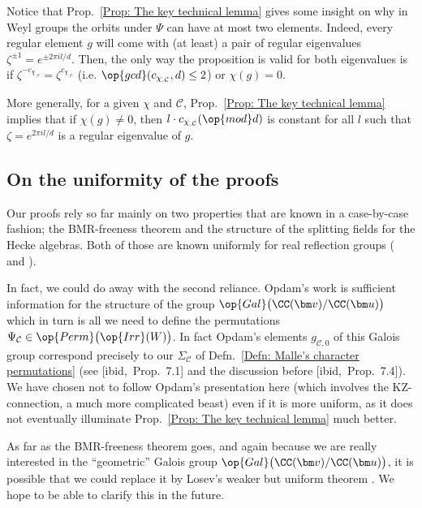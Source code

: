 \begin{rema}
Notice that Prop.~\ref{Prop: The key technical lemma} gives some insight on why in Weyl groups the orbits under $\Psi$ can have at most two elements. Indeed, every regular element $g$ will come with (at least) a pair of regular eigenvalues $\zeta^{\pm 1}=e^{\pm2\pi il/d}$. Then, the only way the proposition is valid for both eigenvalues is if $\zeta^{-c_{\chi_{,\mathcal{C}}}}=\zeta^{c_{\chi_{,\mathcal{C}}}}$ (i.e. $\op{gcd}(c_{\chi_{,\mathcal{C}}},d)\leq 2$) or $\chi(g)=0$.

More generally, for a given $\chi$ and $\mathcal{C}$, Prop.~\ref{Prop: The key technical lemma} implies that if $\chi(g)\neq 0$, then $l\cdot c_{\chi_{,\mathcal{C}}}(\op{mod} d)$ is constant for all $l$ such that $\zeta=e^{2\pi i l/d}$ is a regular eigenvalue of $g$.
\end{rema}


\subsection{On the uniformity of the proofs}
\label{Section: On the uniformity of the proofs}

Our proofs rely so far mainly on two properties that are known in a case-by-case fashion; the BMR-freeness theorem and the structure of the splitting fields for the Hecke algebras. Both of those are known uniformly for real reflection groups (\cite[Thm.~4.4.6]{geck-pfeiffer-book} and \cite[Thm.~5]{opdam-remark-on-irr-characters}).

In fact, we could do away with the second reliance. Opdam's work \cite[Thm.~6.7]{opdam-fake-degrees-arxiv} is sufficient information for the structure of the group $\op{Gal}\big(\CC(\bm v)/\CC(\bm u)\big)$ which in turn is all we need to define the permutations $\Psi_{\mathcal{C}}\in\op{Perm}\big( \op{Irr}(W)\big)$. In fact Opdam's elements $g_{\mathcal{C},0}$ of this Galois group correspond precisely to our $\Sigma_{\mathcal{C}}$ of Defn.~\ref{Defn: Malle's character permutations} (see [ibid,~Prop.~7.1] and the discussion before [ibid,~Prop.~7.4]). We have chosen not to follow Opdam's presentation here (which involves the KZ-connection, a much more complicated beast) even if it is more uniform, as it does not eventually illuminate Prop.~\ref{Prop: The key technical lemma} much better. 

As far as the BMR-freeness theorem goes, and again because we are really interested in the ``geometric'' Galois group $\op{Gal}\big(\CC(\bm v)/\CC(\bm u)\big)$, it is possible that we could replace it by Losev's weaker but uniform theorem \cite{losev-finite-dim-quotients}. We hope to be able to clarify this in the future.


